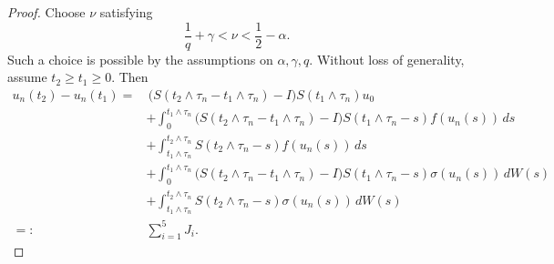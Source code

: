 \documentclass[10pt]{article}
\numberwithin{figure}{section}
\numberwithin{equation}{section}
\newcommand{\0}{{\theta}}
\begin{document}
\begin{proof}


Choose $\nu$ satisfying
$$
\frac1q+\gamma<\nu<\frac12-\alpha.
$$
Such a choice is possible by the assumptions on $\alpha,\gamma,q$. 
\vs
Without loss of generality, assume $t_2\ge t_1\ge0$. Then
\begin{equation}\label{eq3.13}
\begin{split}
u_n(t_2)-u_n(t_1)
=&\,\big(S(t_2\wedge\tau_n-t_1\wedge\tau_n)-I\big)S(t_1\wedge\tau_n)u_0\\
&+\int_0^{t_1\wedge\tau_n}\big(S(t_2\wedge\tau_n-t_1\wedge\tau_n)-I\big)S(t_1\wedge\tau_n-s)f(u_n(s))\,ds\\
&+\int_{t_1\wedge\tau_n}^{t_2\wedge\tau_n} S(t_2\wedge\tau_n-s)f(u_n(s))\,ds\\
&+\int_0^{t_1\wedge\tau_n}\big(S(t_2\wedge\tau_n-t_1\wedge\tau_n)-I\big)S(t_1\wedge\tau_n-s)\sigma(u_n(s))\,dW(s)\\
&+\int_{t_1\wedge\tau_n}^{t_2\wedge\tau_n} S(t_2\wedge\tau_n-s)\sigma(u_n(s))\,dW(s)\\
=:&\sum_{i=1}^5 J_i.
\end{split}
\end{equation}


\end{proof}
\end{document}

